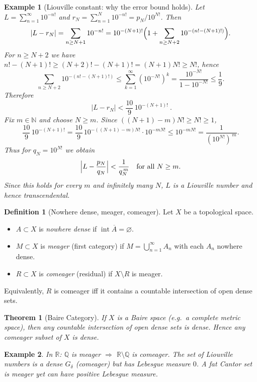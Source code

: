 \documentclass[11pt,a4paper]{article}
\newtheorem{theorem}{Theorem}
\newtheorem{example}{Example}
\theoremstyle{definition}
\theoremstyle{definition}
\newtheorem{definition}[exercise]{Definition}
\theoremstyle{plain}
\theoremstyle{remark}
\begin{document}
\begin{example}[Liouville constant: why the error bound holds]
	Let $L=\sum_{n=1}^\infty 10^{-n!}$ and $r_N=\sum_{n=1}^{N}10^{-n!}=p_N/10^{N!}$.
	Then
	\[
	|L-r_N|=\sum_{n\ge N+1}10^{-n!}
	=10^{-(N+1)!}\Bigl(1+\sum_{n\ge N+2}10^{-(n!-(N+1)!)}\Bigr).
	\]
	For $n\ge N+2$ we have $n!-(N+1)!\ge (N+2)!-(N+1)!=(N+1)N!\ge N!$, hence
	\[
	\sum_{n\ge N+2}10^{-(n!-(N+1)!)}\le \sum_{k=1}^\infty (10^{-N!})^{k}
	=\frac{10^{-N!}}{1-10^{-N!}}\le \frac{1}{9}.
	\]
	Therefore
	\[
	\boxed{\ |L-r_N|< \frac{10}{9}\,10^{-(N+1)!}\ }.
	\]
	Fix $m\in\mathbb N$ and choose $N\ge m$. Since $((N+1)-m)N!\ge N!\ge1$,
	\[
	\frac{10}{9}\,10^{-(N+1)!}
	=\frac{10}{9}\,10^{-((N+1)-m)N!}\cdot 10^{-mN!}\le 10^{-mN!}
	=\frac{1}{(10^{N!})^{\,m}}.
	\]
	Thus for $q_N=10^{N!}$ we obtain
	\[
	\Bigl|L-\frac{p_N}{q_N}\Bigr|<\frac{1}{q_N^{\,m}}
	\quad\text{for all }N\ge m.
	\]
	Since this holds for every $m$ and infinitely many $N$, $L$ is a Liouville number and hence transcendental.
\end{example}


\begin{definition}[Nowhere dense, meager, comeager]
	Let $X$ be a topological space.
	\begin{itemize}
		\item $A\subset X$ is \emph{nowhere dense} if $\operatorname{int}\overline{A}=\varnothing$.
		\item $M\subset X$ is \emph{meager} (first category) if $M=\bigcup_{n=1}^\infty A_n$ with each $A_n$ nowhere dense.
		\item $R\subset X$ is \emph{comeager} (residual) if $X\setminus R$ is meager.
	\end{itemize}
	Equivalently, $R$ is comeager iff it contains a countable intersection of open dense sets.
\end{definition}

\begin{theorem}[Baire Category]
	If $X$ is a Baire space (e.g.\ a complete metric space), then any countable intersection
	of open dense sets is dense. Hence any comeager subset of $X$ is dense.
\end{theorem}

\begin{example}
	In $\mathbb R$: $\mathbb Q$ is meager $\Rightarrow$ $\mathbb R\setminus\mathbb Q$ is comeager.
	The set of Liouville numbers is a dense $G_\delta$ (comeager) but has Lebesgue measure $0$.
	A fat Cantor set is meager yet can have positive Lebesgue measure.
\end{example}
\end{document}
